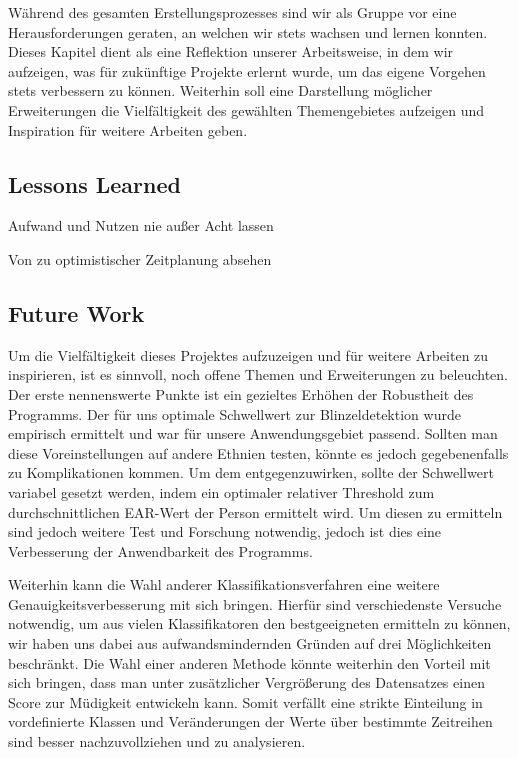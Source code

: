 Während des gesamten Erstellungsprozesses sind wir als Gruppe vor eine Herausforderungen geraten, an welchen wir stets wachsen und lernen konnten. Dieses Kapitel dient als eine Reflektion unserer Arbeitsweise, in dem wir aufzeigen, was für zukünftige Projekte erlernt wurde, um das eigene Vorgehen stets verbessern zu können. Weiterhin soll eine Darstellung möglicher Erweiterungen die Vielfältigkeit des gewählten Themengebietes aufzeigen und Inspiration für weitere Arbeiten geben.

\subsection{Lessons Learned}


Aufwand und Nutzen nie außer Acht lassen

Von zu optimistischer Zeitplanung absehen


\subsection{Future Work}
Um die Vielfältigkeit dieses Projektes aufzuzeigen und für weitere Arbeiten zu inspirieren, ist es sinnvoll, noch offene Themen und Erweiterungen zu beleuchten. Der erste nennenswerte Punkte ist ein gezieltes Erhöhen der Robustheit des Programms. Der für uns optimale Schwellwert zur Blinzeldetektion wurde empirisch ermittelt und war für unsere Anwendungsgebiet passend. Sollten man diese Voreinstellungen auf andere Ethnien testen, könnte es jedoch gegebenenfalls zu Komplikationen kommen. Um dem entgegenzuwirken, sollte der Schwellwert variabel gesetzt werden, indem ein optimaler relativer Threshold zum durchschnittlichen EAR-Wert der Person ermittelt wird. Um diesen zu ermitteln sind jedoch weitere Test und Forschung notwendig, jedoch ist dies eine Verbesserung der Anwendbarkeit des Programms.

Weiterhin kann die Wahl anderer Klassifikationsverfahren eine weitere Genauigkeitsverbesserung mit sich bringen. Hierfür sind verschiedenste Versuche notwendig, um aus vielen Klassifikatoren den bestgeeigneten ermitteln zu können, wir haben uns dabei aus aufwandsmindernden Gründen auf drei Möglichkeiten beschränkt. Die Wahl einer anderen Methode könnte weiterhin den Vorteil mit sich bringen, dass man unter zusätzlicher Vergrößerung des Datensatzes einen Score zur Müdigkeit entwickeln kann. Somit verfällt eine strikte Einteilung in vordefinierte Klassen und Veränderungen der Werte über bestimmte Zeitreihen sind besser nachzuvollziehen und zu analysieren.

